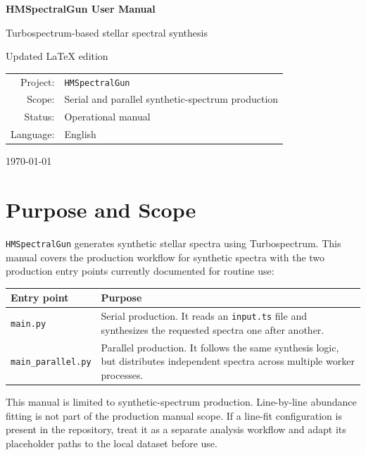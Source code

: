 \documentclass[11pt,a4paper]{article}
\newcommand{\code}[1]{\texttt{#1}}
\begin{document}
\begin{titlepage}
  \centering
  \vspace*{2.5cm}
  {\Huge\bfseries HMSpectralGun User Manual\par}
  \vspace{0.4cm}
  {\Large Turbospectrum-based stellar spectral synthesis\par}
  \vspace{1.5cm}
  {\large Updated LaTeX edition\par}
  \vfill
  \begin{tabular}{rl}
    Project: & \code{HMSpectralGun} \\
    Scope: & Serial and parallel synthetic-spectrum production \\
    Status: & Operational manual \\
    Language: & English \\
  \end{tabular}
  \vfill
  {\large \today\par}
\end{titlepage}

\tableofcontents
\newpage

\section{Purpose and Scope}

\code{HMSpectralGun} generates synthetic stellar spectra using Turbospectrum. This manual covers the production workflow for synthetic spectra with the two production entry points currently documented for routine use:

\begin{longtable}{p{}p{}}
\toprule
\textbf{Entry point} & \textbf{Purpose} \\
\midrule
\code{main.py} & Serial production. It reads an \code{input.ts} file and synthesizes the requested spectra one after another. \\
\code{main\_parallel.py} & Parallel production. It follows the same synthesis logic, but distributes independent spectra across multiple worker processes. \\
\bottomrule
\end{longtable}

\begin{importantbox}
This manual is limited to synthetic-spectrum production. Line-by-line abundance fitting is not part of the production manual scope. If a line-fit configuration is present in the repository, treat it as a separate analysis workflow and adapt its placeholder paths to the local dataset before use.
\end{importantbox}
\end{document}
